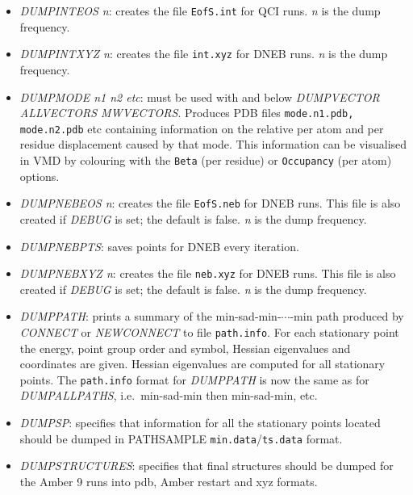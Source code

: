 \documentclass[12pt,a4paper,dvips]{article}
\begin{document}
\begin{itemize}
\item {\it DUMPINTEOS n\/}: creates the file {\tt EofS.int} for QCI runs. 
{\it n\/} is the dump frequency.

\item {\it DUMPINTXYZ n\/}: creates the file {\tt int.xyz} for DNEB runs. 
{\it n\/} is the dump frequency.

\item {\it DUMPMODE n1 n2 etc\/}: must be used with and below {\it DUMPVECTOR ALLVECTORS MWVECTORS}. Produces PDB files {\tt mode.n1.pdb, mode.n2.pdb} etc containing information on the relative per atom and per residue displacement caused by that mode. This information can be visualised in VMD by colouring with the {\tt Beta} (per residue) or {\tt Occupancy} (per atom) options.

\item {\it DUMPNEBEOS n\/}: creates the file {\tt EofS.neb} for DNEB runs. This file is
also created if {\it DEBUG\/} is set; the default is false.
{\it n\/} is the dump frequency.

\item {\it DUMPNEBPTS\/}: saves points for DNEB every iteration.

\item {\it DUMPNEBXYZ n\/}: creates the file {\tt neb.xyz} for DNEB runs. This file is
also created if {\it DEBUG\/} is set; the default is false.
{\it n\/} is the dump frequency.

\item {\it DUMPPATH\/}: prints a summary of the min-sad-min-$\cdots$-min path produced by {\it CONNECT} 
or {\it NEWCONNECT\/} to
file {\tt path.info}. For each stationary point the energy, point group order and symbol, 
Hessian eigenvalues and coordinates are given. Hessian eigenvalues are computed
for all stationary points.
The {\tt path.info} format for {\it DUMPPATH\/} is now the same as
for {\it DUMPALLPATHS\/}, i.e.~min-sad-min then min-sad-min, etc.

\item {\it DUMPSP\/}: specifies that information for all the stationary points located
should be dumped in 
PATHSAMPLE {\tt min.data}/{\tt ts.data} format.

\item {\it DUMPSTRUCTURES\/}: specifies that final structures should be dumped for the Amber 9 
runs into pdb, Amber restart and xyz formats.


\end{itemize}
\end{document}
